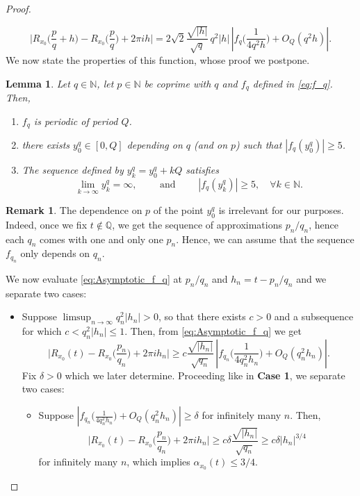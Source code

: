 \documentclass[11pt,reqno]{amsart}
\newtheorem{lem}[thm]{Lemma}
\theoremstyle{definition}
\newtheorem{rem}[thm]{Remark}
\begin{document}
\begin{proof}
\begin{itemize}
	\begin{equation}\label{eq:Asymptotic_f_q}
	\Big|  R_{x_0}\Big( \frac{p}{q} + h \Big) - R_{x_0}\Big( \frac{p}{q} \Big) + 2\pi i h  \Big|
	= 2\sqrt{2}  \frac{\sqrt{|h|}}{\sqrt{q}} \,  q^{2} |h| \,
\left|  f_q\Big( \frac{1}{4q^2 h}  \Big)  + O_Q\left( q^{2} h  \right)
\right|.
	\end{equation}
We now state the properties of this function, whose proof we postpone. 
\begin{lem}\label{thm:Lemma_f_q}
Let $q \in \mathbb N$, let $p \in \mathbb N$ be coprime with $q$ and $f_q$ defined in \eqref{eq:f_q}. 
Then, 
\begin{enumerate}
	\item $f_q$ is periodic of period $Q$.
	\item there exists $y_0^q \in [0,Q]$ depending on $q$ (and on $p$) such that $|f_q(y_0^q) | \geq 5$.
	\item The sequence defined by $y_k^q = y_0^q + kQ$ satisfies 
	\begin{equation}
	\lim_{k \to \infty} y_k^q = \infty, \qquad \text{ and } \qquad  |f_q(y_k^q)| \geq 5, \quad \forall k \in \mathbb N. 
	\end{equation}
\end{enumerate}
\end{lem}
\begin{rem}
The dependence on $p$ of the point $y_0^q$ is irrelevant for our purposes.
Indeed, once we fix $t \not\in \mathbb Q$, we get the sequence of approximations $p_n/q_n$, 
hence each $q_n$ comes with one and only one $p_n$. 
Hence, we can assume that the sequence $f_{q_n}$ only depends on $q_n$. 
\end{rem}
We now evaluate \eqref{eq:Asymptotic_f_q} at $p_n/q_n$ and $h_n = t - p_n/q_n$ and we separate two cases:
\begin{itemize}
	\item[\textbf{Case 2.1.}] Suppose $\limsup_{n \to \infty} q_n^2 |h_n| > 0$, so that there exists $c > 0$ and a subsequence for which $c < q_n^2 |h_n| \leq 1$.
	Then, from \eqref{eq:Asymptotic_f_q} we get
		\begin{equation}
	\Big|  R_{x_0}( t ) - R_{x_0}\Big( \frac{p_n}{q_n} \Big) + 2\pi i h_n  \Big|
	\geq c  \frac{\sqrt{|h_n|}}{\sqrt{q_n}} \,
\left|  f_{q_n}\Big( \frac{1}{4q_n^2 h_n}  \Big)  + O_Q\left( q_n^2 h_n  \right)
\right|.
	\end{equation}
	Fix $\delta>0$ which we later determine. Proceeding like in \textbf{Case 1}, we separate two cases:
	\begin{itemize}
		\item[\textbf{Case 2.1.1.}] Suppose $\left|  f_{q_n}\Big( \frac{1}{4q_n^2 h_n}  \Big)  + O_Q\left( q_n^2 h_n  \right) \right| \geq \delta$ for infinitely many $n$. Then, 
		\begin{equation}
	\Big|  R_{x_0}( t ) - R_{x_0}\Big( \frac{p_n}{q_n} \Big) + 2\pi i h_n  \Big|
	\geq c \delta \frac{\sqrt{|h_n|}}{\sqrt{q_n}} 
	\geq c\delta |h_n|^{3/4} 
	\end{equation}
		for infinitely many $n$, which implies $\alpha_{x_0}(t) \leq 3/4$.
				

\end{itemize}
\end{itemize}
\end{itemize}
\end{proof}
\end{document}
